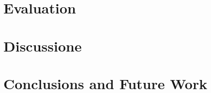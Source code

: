 \documentclass{llncs}
\begin{document}
\section{Evaluation}




\section{Discussione}


\section{Conclusions and Future Work}




%
%
%
%
%
%
%
\clearpage
%
\end{document}

